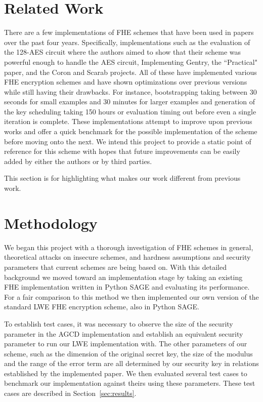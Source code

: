 \documentclass[letterpaper,twocolumn,10pt]{article}
\begin{document}
\section{Related Work}
There are a few implementations of FHE schemes that have been used in papers over the past four years. Specifically, implementations such as the evaluation of the 128-AES circuit\cite{AES} where the authors aimed to show that their scheme was powerful enough to handle the AES circuit, Implementing Gentry\cite{ImplementingGentry}, the ``Practical" paper\cite{Practical}, and the Coron and Scarab projects. All of these have implemented various FHE encryption schemes and have shown optimizations over previous versions while still having their drawbacks. For instance, bootstrapping taking between 30 seconds for small examples and 30 minutes for larger examples\cite{ImplementingGentry} and generation of the key scheduling taking 150 hours or evaluation timing out before even a single iteration is complete\cite{AES}. These implementations attempt to improve upon previous works and offer a quick benchmark for the possible implementation of the scheme before moving onto the next. We intend this project to provide a static point of reference for this scheme with hopes that future improvements can be easily added by either the authors or by third parties.

This section is for highlighting what makes our work different from previous work.


\section{Methodology}
We began this project with a thorough investigation of FHE schemes in general, theoretical attacks on insecure schemes, and hardness assumptions and security parameters that current schemes are being based on. With this detailed background we moved toward an implementation stage by taking an existing FHE implementation written in Python SAGE and evaluating its performance. For a fair comparison to this method we then implemented our own version of the standard LWE FHE encryption scheme, also in Python SAGE.

To establish test cases, it was necessary to observe the size of the security parameter in the AGCD implementation and establish an equivalent security parameter to run our LWE implementation with. The other parameters of our scheme, such as the dimension of the original secret key, the size of the modulus and the range of the error term are all determined by our security key in relations established by the implemented paper\cite{StandardLWE}. We then evaluated several test cases to benchmark our implementation against theirs using these parameters. These test cases are described in Section~\ref{sec:results}.
\end{document}
